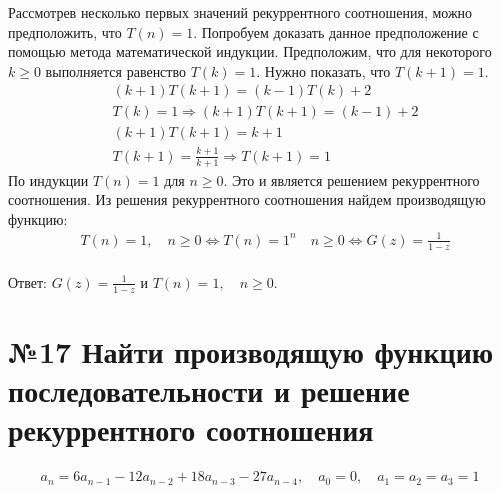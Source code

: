 \documentclass[a4paper,12pt,numbers=noenddot]{scrreprt}
\begin{document}
\begin{flushleft}
    Рассмотрев несколько первых значений рекуррентного соотношения, можно предположить, что $T(n)=1$. Попробуем доказать данное предположение с помощью метода математической индукции.
    Предположим, что для некоторого $k \geq 0$ выполняется равенство $T(k)=1$. Нужно показать, что $T(k+1)=1$.
    \begin{align}
        & (k+1)T(k+1)=(k-1)T(k)+2 \\&
        T(k)=1 \Rightarrow (k+1)T(k+1)=(k-1)+2 \\&
        (k+1)T(k+1)=k+1 \\&
        T(k+1)=\frac{k+1}{k+1} \Rightarrow T(k+1)=1
    \end{align}
    По индукции $T(n)=1$ для $n \geq 0$. Это и является решением рекуррентного соотношения.
    Из решения рекуррентного соотношения найдем производящую функцию:
    \begin{align}
        & T(n)=1, \quad n \geq 0 \Leftrightarrow T(n)=1^n \quad n \geq 0 \Leftrightarrow G(z)=\frac{1}{1-z} \\&
    \end{align}
\end{flushleft}

\begin{flushleft}
Ответ: $G(z)=\frac{1}{1-z}$ и $T(n)=1, \quad n \geq 0$.
\end{flushleft}

\section{№17 Найти производящую функцию последовательности и решение рекуррентного соотношения}

\begin{align}
    a_n=6a_{n-1}-12a_{n-2}+18a_{n-3}-27a_{n-4}, \quad a_0=0, \quad a_1=a_2=a_3 = 1
\end{align}
\end{document}
